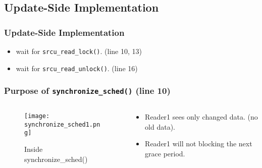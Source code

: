 \documentclass{beamer}
\begin{document}

\subsection{Update-Side Implementation}


\begin{frame}[t]
  \frametitle{Update-Side Implementation}

  

  \begin{itemize}
  \item wait for \texttt{srcu\_read\_lock()}. (line 10, 13)
  \item wait for \texttt{srcu\_read\_unlock()}. (line 16)
  \end{itemize}
  
\end{frame}


\begin{frame}[t]
  \frametitle{Purpose of \texttt{synchronize\_sched()} (line 10)}

  \begin{columns}
    \begin{column}{.4\textwidth}
      \begin{figure}[ht]
        \centering
        \texttt{[image: synchronize\_sched1.png]}
        \caption{Inside synchronize\_sched()}
      \end{figure}
    \end{column}

    \begin{column}{.6\textwidth}
      \begin{itemize}
      \item Reader1 sees only changed data. (no old data).
      \item Reader1 will not blocking the next grace period.
      \end{itemize}
    \end{column}
  \end{columns}
  
\end{frame}

\end{document}
